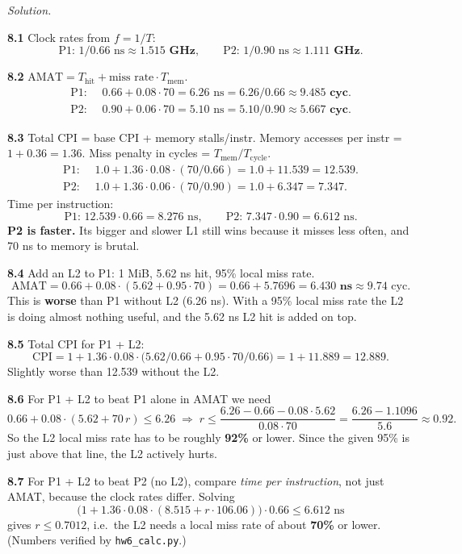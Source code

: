\documentclass[12pt]{article}
\newenvironment{solution}{\par\noindent\textit{Solution.}\ }{\par\vspace{1.1em}}
\newcommand{\subproblem}[1]{\par\vspace{0.45em}\noindent\textbf{#1}\quad}
\begin{document}
\begin{solution}
\subproblem{8.1} Clock rates from $f = 1/T$:
\[
\text{P1: } 1/0.66\text{ ns} \approx \mathbf{1.515\text{ GHz}}, \qquad
\text{P2: } 1/0.90\text{ ns} \approx \mathbf{1.111\text{ GHz}}.
\]

\subproblem{8.2} $\text{AMAT} = T_{\text{hit}} + \text{miss rate} \cdot T_{\text{mem}}$.
\begin{align*}
\text{P1: } &\ 0.66 + 0.08 \cdot 70 = 6.26\text{ ns} = 6.26/0.66 \approx \mathbf{9.485\text{ cyc}}. \\
\text{P2: } &\ 0.90 + 0.06 \cdot 70 = 5.10\text{ ns} = 5.10/0.90 \approx \mathbf{5.667\text{ cyc}}.
\end{align*}

\subproblem{8.3} Total CPI = base CPI + memory stalls/instr. Memory accesses per instr = $1 + 0.36 = 1.36$. Miss penalty in cycles = $T_{\text{mem}}/T_{\text{cycle}}$.
\begin{align*}
\text{P1: } &\ 1.0 + 1.36 \cdot 0.08 \cdot (70/0.66) = 1.0 + 11.539 = \mathbf{12.539}. \\
\text{P2: } &\ 1.0 + 1.36 \cdot 0.06 \cdot (70/0.90) = 1.0 + 6.347  = \mathbf{7.347}.
\end{align*}
Time per instruction:
\[
\text{P1: } 12.539 \cdot 0.66 = 8.276\text{ ns}, \qquad
\text{P2: } 7.347 \cdot 0.90 = 6.612\text{ ns}.
\]
\textbf{P2 is faster.} Its bigger and slower L1 still wins because it misses less often, and 70 ns to memory is brutal.

\subproblem{8.4} Add an L2 to P1: 1 MiB, 5.62 ns hit, 95\% local miss rate.
\[
\text{AMAT} = 0.66 + 0.08\cdot(5.62 + 0.95\cdot 70) = 0.66 + 5.7696 = \mathbf{6.430\text{ ns}} \approx 9.74\text{ cyc}.
\]
This is \textbf{worse} than P1 without L2 (6.26 ns). With a 95\% local miss rate the L2 is doing almost nothing useful, and the 5.62 ns L2 hit is added on top.

\subproblem{8.5} Total CPI for P1 + L2:
\[
\text{CPI} = 1 + 1.36 \cdot 0.08 \cdot \big(5.62/0.66 + 0.95 \cdot 70/0.66\big) = 1 + 11.889 = \mathbf{12.889}.
\]
Slightly worse than 12.539 without the L2.

\subproblem{8.6} For P1 + L2 to beat P1 alone in AMAT we need
\[
0.66 + 0.08\cdot(5.62 + 70\,r) \le 6.26 \;\Rightarrow\; r \le \frac{6.26-0.66-0.08\cdot 5.62}{0.08\cdot 70} = \frac{6.26-1.1096}{5.6}\approx \mathbf{0.92}.
\]
So the L2 local miss rate has to be roughly \textbf{92\%} or lower. Since the given 95\% is just above that line, the L2 actively hurts.

\subproblem{8.7} For P1 + L2 to beat P2 (no L2), compare \emph{time per instruction}, not just AMAT, because the clock rates differ. Solving
\[
\big(1 + 1.36\cdot 0.08\cdot(8.515 + r\cdot 106.06)\big)\cdot 0.66 \le 6.612\text{ ns}
\]
gives $r \le \mathbf{0.7012}$, i.e.\ the L2 needs a local miss rate of about \textbf{70\%} or lower. (Numbers verified by \texttt{hw6\_calc.py}.)
\end{solution}
\end{document}
